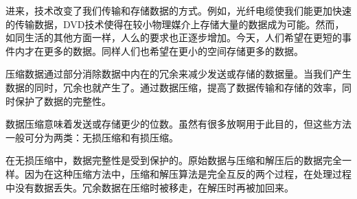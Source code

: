 
进来，技术改变了我们传输和存储数据的方式。例如，光纤电缆使我们能更加快速的传输数据，DVD技术使得在较小物理媒介上存储大量的数据成为可能。然而，如同生活的其他方面一样，人么的要求也正逐步增加。今天，人们希望在更短的事件内才在更多的数据。同样人们也希望在更小的空间存储更多的数据。 

压缩数据通过部分消除数据中内在的冗余来减少发送或存储的数据量。当我们产生数据的同时，冗余也就产生了。通过数据压缩，提高了数据传输和存储的效率，同时保护了数据的完整性。 

数据压缩意味着发送或存储更少的位数。虽然有很多放啊用于此目的，但这些方法一般可分为两类：无损压缩和有损压缩。 

在无损压缩中，数据完整性是受到保护的。原始数据与压缩和解压后的数据完全一样。因为在这种压缩方法中，压缩和解压算法是完全互反的两个过程，在处理过程中没有数据丢失。冗余数据在压缩时被移走，在解压时再被加回来。

